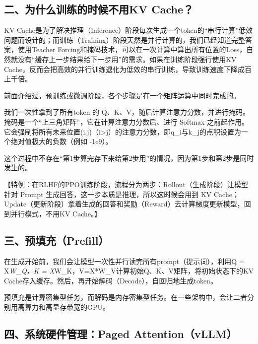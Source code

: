 \hypertarget{ux4e8cux4e3aux4ec0ux4e48ux8badux7ec3ux7684ux65f6ux5019ux4e0dux7528kv-cache}{%
\subsection{二、为什么训练的时候不用KV Cache？}\label{ux4e8cux4e3aux4ec0ux4e48ux8badux7ec3ux7684ux65f6ux5019ux4e0dux7528kv-cache}}

KV Cache是为了解决推理（Inference）阶段每次生成一个token的``串行计算''低效问题而设计的；而训练（Training）阶段天然是并行计算的，我们已经知道完整答案，使用Teacher Forcing和掩码技术，可以在一次计算中算出所有位置的Loss，自然就没有``缓存上一步结果给下一步用''的需求。如果在训练阶段强行使用KV Cache，反而会把高效的并行训练退化为低效的串行训练，导致训练速度下降成百上千倍。

前面介绍过，预训练或微调阶段，各个步骤是在一个矩阵运算中同时完成的。

我们一次性拿到了所有token 的 Q、K、V，随后计算注意力分数，并进行掩码。掩码是一个``上三角矩阵''，它在计算注意力分数后、进行 Softmax 之前起作用。它会强制将所有未来位置(i,j)（i\textgreater j）的注意力分数，即q\_i与k\_j的点积设置为一个绝对值极大的负数（例如 -1e9）。

这个过程中不存在``第1步算完存下来给第2步用''的情况，因为第1步和第2步是同时发生的。

【特例：在RLHF的PPO训练阶段，流程分为两步：Rollout（生成阶段）让模型针对 Prompt 生成回答，这一步本质是推理，所以这时候会用到 KV Cache；Update（更新阶段）拿着生成的回答和奖励（Reward）去计算梯度更新模型，回到并行模式，不用KV Cache。】

\hypertarget{ux4e09ux9884ux586bux5145prefill}{%
\subsection{三、预填充（Prefill）}\label{ux4e09ux9884ux586bux5145prefill}}

在生成开始前，我们会让模型一次性并行读完所有prompt（提示词），利用Q = X\emph{W\_Q，K = X}W\_K，V=X*W\_V计算初始Q、K、V矩阵，将初始状态下的KV Cache存入缓存。然后，再开始解码（Decode），自回归地生成token。

预填充是计算密集型任务，而解码是内存密集型任务。在一些架构中，会让二者分别用高算力和高显存带宽的GPU。

\hypertarget{ux56dbux7cfbux7edfux786cux4ef6ux7ba1ux7406paged-attentionvllm}{%
\subsection{四、系统硬件管理：Paged Attention（vLLM）}\label{ux56dbux7cfbux7edfux786cux4ef6ux7ba1ux7406paged-attentionvllm}}

